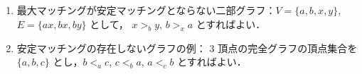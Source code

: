 \subsection{}
\begin{enumerate}
 \item 最大マッチングが安定マッチングとならない二部グラフ：$V = \{a,b,x,y\}$, $E=\{ax,bx,by\}$ として，
 $x >_{b}y$, $b>_{x}a$ とすればよい．
 \item 安定マッチングの存在しないグラフの例：
 $3$ 頂点の完全グラフの頂点集合を $\{a,b,c\}$ とし，$b <_{a} c$, $c <_{b} a$, $a <_{c} b$ とすればよい．
\end{enumerate}